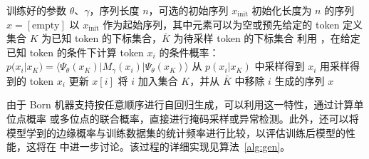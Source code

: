 \begin{algorithm}[H]
\caption{带条件依赖的生成式采样}
\label{alg:gen}
\begin{algorithmic}
\REQUIRE 训练好的参数 $\theta$、$\gamma$，序列长度 $n$，可选的初始序列 $x_{\text{init}}$
    \STATE 初始化长度为 $n$ 的序列 $x = [ \text{empty} ]$
\ELSE
    \STATE 以 $x_{\text{init}}$ 作为起始序列，其中元素可以为空或预先给定的 token
\ENDIF
\STATE 定义集合 $K$ 为已知 token 的下标集合，$\bar{K}$ 为待采样 token 的下标集合
            \STATE 利用 ，在给定已知 token 的条件下计算 token $x_i$ 的条件概率：
            \STATE $p(x_i|x_{K}) = \langle \Psi_{\theta}(x_{K}) | M_{\gamma}(x_i) | \Psi_{\theta}(x_{K}) \rangle$
            \STATE 从 $p(x_i|x_{K})$ 中采样得到 $x_i$
            \STATE 用采样得到的 token $x_i$ 更新 $x[i]$
            \STATE 将 $i$ 加入集合 $K$，并从 $\bar{K}$ 中移除 $i$
        \ENDIF
    \ENDFOR
\ENDWHILE
\ENSURE 生成的序列 $x$
\end{algorithmic}
\end{algorithm}

由于 Born 机器支持按任意顺序进行自回归生成，可以利用这一特性，通过计算单位点概率  或多位点的联合概率，直接进行掩码采样或异常检测。此外，还可以将模型学到的边缘概率与训练数据集的统计频率进行比较，以评估训练后模型的性能，这将在  中进一步讨论。该过程的详细实现见算法~\ref{alg:gen}。
